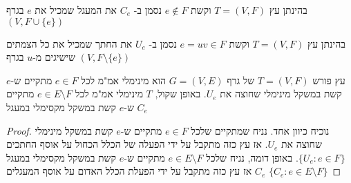 \begin{definition}
בהינתן עץ 
$T = (V, F)$
וקשת 
$e \notin F$
נסמן ב-%
$C_e$
את המעגל שמכיל את $e$ בגרף 
$(V, F \cup \{e\})$
\end{definition}
\begin{definition}
בהינתן עץ 
$T = (V, F)$
וקשת 
$e = uv \in F$
נסמן ב-%
$U_e$
את החתך שמכיל את כל הצמתים שישיגים מ-$u$ בגרף
$(V, F \setminus \{e\})$
\end{definition}

\begin{theorem}
עץ פורש 
$T = (V, F)$
של גרף 
$G = (V, E)$
הוא מינימלי אמ"מ לכל 
$e \in F$
מתקיים ש-$e$ קשת במשקל מינימלי שחוצה את 
$U_e$.
באופן שקול, $T$ מינימלי אמ"מ לכל 
$e \in E \setminus F$
מתקיים ש-$e$ קשת במשקל מקסימלי במעגל 
$C_e$
\end{theorem}
\begin{proof}
נוכיח כיוון אחד. 
נניח שמתקיים שלכל 
$e \in F$
מתקיים ש-$e$ קשת במשקל מינימלי שחוצה את 
$U_e$.
אז עץ כזה מתקבל על ידי הפעלה של הכלל הכחול על אוסף החתכים 
$\{U_e : e \in F\}$.
באופן דומה, נניח שלכל 
$e \in E \setminus F$
מתקיים ש-$e$ קשת במשקל מקסימלי במעגל 
$C_e$
אז עץ כזה מתקבל על ידי הפעלת הכלל האדום על אוסף המעגלים 
$\{C_e : e \in E \setminus F\}$
\end{proof}
